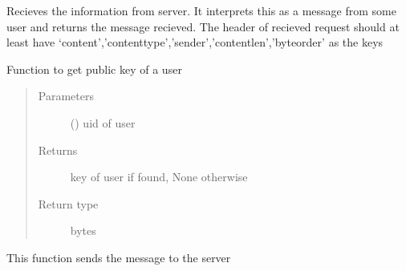 \documentclass[letterpaper,10pt,english]{sphinxmanual}
\begin{document}
\begin{fulllineitems}
\begin{fulllineitems}
\label{\detokenize{Message:Message.Message._recvmsg}}
Recieves the information from server. It interprets this as a message from some user and returns the message recieved. The header of recieved request should at least have ‘content’,’content\sphinxhyphen{}type’,’sender’,’content\sphinxhyphen{}len’,’byteorder’ as the keys

\end{fulllineitems}


\begin{fulllineitems}
\label{\detokenize{Message:Message.Message._get_user_public_key}}
Function to get public key of a user
\begin{quote}\begin{description}
\item[{Parameters}] \leavevmode
{} () \textendash{} uid of user

\item[{Returns}] \leavevmode
key of user if found, None otherwise

\item[{Return type}] \leavevmode
bytes

\end{description}\end{quote}

\end{fulllineitems}


\begin{fulllineitems}
\label{\detokenize{Message:Message.Message._sendmsg}}
This function sends the message to the server

\end{fulllineitems}



\end{fulllineitems}
\end{document}
